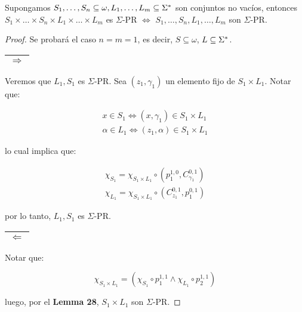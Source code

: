   \begin{lemma}
    \PN Supongamos $S_{1}, \dotsc, S_{n} \subseteq \omega, L_{1}, \dotsc, L_{m} \subseteq \Sigma^{\ast}$ son conjuntos no
    vacíos, entonces $S_{1} \times \dotsc \times S_{n} \times L_{1} \times \dotsc \times L_{m}$ es $\Sigma$-PR $\Leftrightarrow$
    $S_{1}, \dotsc, S_{n}, L_{1}, \dotsc, L_{m}$ son $\Sigma$-PR.
  \end{lemma}
  \begin{proof}
    \PN Se probará el caso $n = m = 1$, es decir, $S \subseteq \omega$, $L \subseteq \Sigma^{\ast}$.

    \vspace{3mm}
    \begin{tabular}{|c|} \hline $\Rightarrow$ \\\hline \end{tabular} Veremos que $L_{1}, S_{1}$ es $\Sigma$-PR. Sea
    $(z_{1}, \gamma_{1})$ un elemento fijo de $S_{1} \times L_{1}$. Notar que:

    \begin{eqnarray*}
      x \in S_{1} \Leftrightarrow (x, \gamma_{1}) \in S_{1} \times L_{1} \\
      \alpha \in L_{1} \Leftrightarrow (z_{1}, \alpha) \in S_{1} \times L_{1}
    \end{eqnarray*}

    \PN lo cual implica que:

    \begin{eqnarray*}
      \chi_{S_{1}} = \chi_{S_{1} \times L_{1}} \circ \left(p_{1}^{1,0}, C_{\gamma_{1}}^{0,1}\right) \\
      \chi_{L_{1}} = \chi_{S_{1} \times L_{1}} \circ \left(C_{z_{1}}^{0,1}, p_{1}^{0,1}\right)
    \end{eqnarray*}

    \PN por lo tanto, $L_{1}, S_{1}$ es $\Sigma$-PR.

    \vspace{3mm}
    \begin{tabular}{|c|} \hline $\Leftarrow$\\\hline \end{tabular} Notar que:

    \[
      \chi_{S_{1} \times L_{1}} = \left(\chi_{S_{1}} \circ p_{1}^{1,1} \wedge \chi_{L_{1}} \circ p_{2}^{1,1} \right)
    \]

    \PN luego, por el \textbf{Lemma 28}, $S_{1} \times L_{1}$ son $\Sigma$-PR.
  \end{proof}

